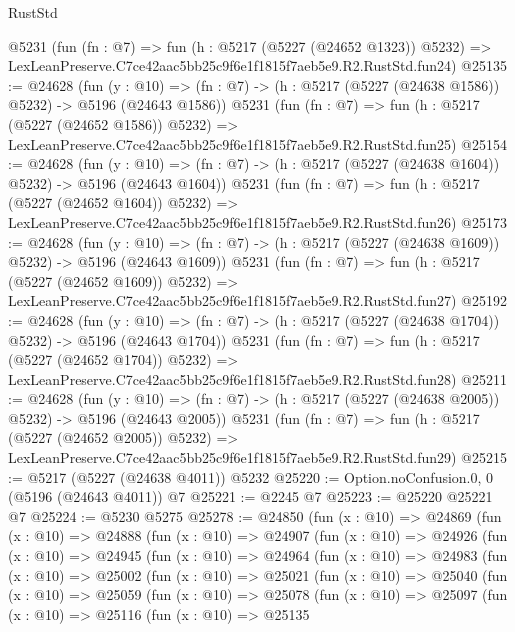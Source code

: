 \begin{lexlean}{RustStd}
\begin{coremodule}
    @5231
    (fun (fn : @7) =>
    fun (h : @5217 (@5227 (@24652 @1323)) @5232) =>
    LexLeanPreserve.C7ce42aac5bb25c9f6e1f1815f7aeb5e9.R2.RustStd.fun24)
@25135 := @24628
    (fun (y : @10) => (fn : @7) -> (h : @5217 (@5227 (@24638 @1586)) @5232) -> @5196 (@24643 @1586))
    @5231
    (fun (fn : @7) =>
    fun (h : @5217 (@5227 (@24652 @1586)) @5232) =>
    LexLeanPreserve.C7ce42aac5bb25c9f6e1f1815f7aeb5e9.R2.RustStd.fun25)
@25154 := @24628
    (fun (y : @10) => (fn : @7) -> (h : @5217 (@5227 (@24638 @1604)) @5232) -> @5196 (@24643 @1604))
    @5231
    (fun (fn : @7) =>
    fun (h : @5217 (@5227 (@24652 @1604)) @5232) =>
    LexLeanPreserve.C7ce42aac5bb25c9f6e1f1815f7aeb5e9.R2.RustStd.fun26)
@25173 := @24628
    (fun (y : @10) => (fn : @7) -> (h : @5217 (@5227 (@24638 @1609)) @5232) -> @5196 (@24643 @1609))
    @5231
    (fun (fn : @7) =>
    fun (h : @5217 (@5227 (@24652 @1609)) @5232) =>
    LexLeanPreserve.C7ce42aac5bb25c9f6e1f1815f7aeb5e9.R2.RustStd.fun27)
@25192 := @24628
    (fun (y : @10) => (fn : @7) -> (h : @5217 (@5227 (@24638 @1704)) @5232) -> @5196 (@24643 @1704))
    @5231
    (fun (fn : @7) =>
    fun (h : @5217 (@5227 (@24652 @1704)) @5232) =>
    LexLeanPreserve.C7ce42aac5bb25c9f6e1f1815f7aeb5e9.R2.RustStd.fun28)
@25211 := @24628
    (fun (y : @10) => (fn : @7) -> (h : @5217 (@5227 (@24638 @2005)) @5232) -> @5196 (@24643 @2005))
    @5231
    (fun (fn : @7) =>
    fun (h : @5217 (@5227 (@24652 @2005)) @5232) =>
    LexLeanPreserve.C7ce42aac5bb25c9f6e1f1815f7aeb5e9.R2.RustStd.fun29)
@25215 := @5217 (@5227 (@24638 @4011)) @5232
@25220 := Option.noConfusion.{0, 0} (@5196 (@24643 @4011)) @7
@25221 := @2245 @7
@25223 := @25220 @25221 @7
@25224 := @5230 @5275
@25278 := @24850
    (fun (x : @10) =>
    @24869
      (fun (x : @10) =>
      @24888
        (fun (x : @10) =>
        @24907
          (fun (x : @10) =>
          @24926
            (fun (x : @10) =>
            @24945
              (fun (x : @10) =>
              @24964
                (fun (x : @10) =>
                @24983
                  (fun (x : @10) =>
                  @25002
                    (fun (x : @10) =>
                    @25021
                      (fun (x : @10) =>
                      @25040
                        (fun (x : @10) =>
                        @25059
                          (fun (x : @10) =>
                          @25078
                            (fun (x : @10) =>
                            @25097
                              (fun (x : @10) =>
                              @25116
                                (fun (x : @10) =>
                                @25135

\end{coremodule}
\end{lexlean}
